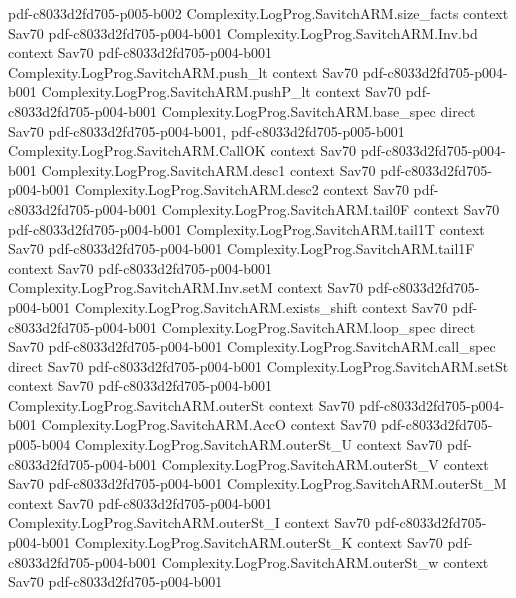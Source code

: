 \begin{theorem}
{    pdf-c8033d2fd705-p005-b002}
\proofstep
  {Complexity.LogProg.SavitchARM.size_facts}
  {context}
  {Sav70}
  {pdf-c8033d2fd705-p004-b001}
\proofstep
  {Complexity.LogProg.SavitchARM.Inv.bd}
  {context}
  {Sav70}
  {pdf-c8033d2fd705-p004-b001}
\proofstep
  {Complexity.LogProg.SavitchARM.push_lt}
  {context}
  {Sav70}
  {pdf-c8033d2fd705-p004-b001}
\proofstep
  {Complexity.LogProg.SavitchARM.pushP_lt}
  {context}
  {Sav70}
  {pdf-c8033d2fd705-p004-b001}
\proofstep
  {Complexity.LogProg.SavitchARM.base_spec}
  {direct}
  {Sav70}
  {pdf-c8033d2fd705-p004-b001,
    pdf-c8033d2fd705-p005-b001}
\proofstep
  {Complexity.LogProg.SavitchARM.CallOK}
  {context}
  {Sav70}
  {pdf-c8033d2fd705-p004-b001}
\proofstep
  {Complexity.LogProg.SavitchARM.desc1}
  {context}
  {Sav70}
  {pdf-c8033d2fd705-p004-b001}
\proofstep
  {Complexity.LogProg.SavitchARM.desc2}
  {context}
  {Sav70}
  {pdf-c8033d2fd705-p004-b001}
\proofstep
  {Complexity.LogProg.SavitchARM.tail0F}
  {context}
  {Sav70}
  {pdf-c8033d2fd705-p004-b001}
\proofstep
  {Complexity.LogProg.SavitchARM.tail1T}
  {context}
  {Sav70}
  {pdf-c8033d2fd705-p004-b001}
\proofstep
  {Complexity.LogProg.SavitchARM.tail1F}
  {context}
  {Sav70}
  {pdf-c8033d2fd705-p004-b001}
\proofstep
  {Complexity.LogProg.SavitchARM.Inv.setM}
  {context}
  {Sav70}
  {pdf-c8033d2fd705-p004-b001}
\proofstep
  {Complexity.LogProg.SavitchARM.exists_shift}
  {context}
  {Sav70}
  {pdf-c8033d2fd705-p004-b001}
\proofstep
  {Complexity.LogProg.SavitchARM.loop_spec}
  {direct}
  {Sav70}
  {pdf-c8033d2fd705-p004-b001}
\proofstep
  {Complexity.LogProg.SavitchARM.call_spec}
  {direct}
  {Sav70}
  {pdf-c8033d2fd705-p004-b001}
\proofstep
  {Complexity.LogProg.SavitchARM.setSt}
  {context}
  {Sav70}
  {pdf-c8033d2fd705-p004-b001}
\proofstep
  {Complexity.LogProg.SavitchARM.outerSt}
  {context}
  {Sav70}
  {pdf-c8033d2fd705-p004-b001}
\proofstep
  {Complexity.LogProg.SavitchARM.AccO}
  {context}
  {Sav70}
  {pdf-c8033d2fd705-p005-b004}
\proofstep
  {Complexity.LogProg.SavitchARM.outerSt_U}
  {context}
  {Sav70}
  {pdf-c8033d2fd705-p004-b001}
\proofstep
  {Complexity.LogProg.SavitchARM.outerSt_V}
  {context}
  {Sav70}
  {pdf-c8033d2fd705-p004-b001}
\proofstep
  {Complexity.LogProg.SavitchARM.outerSt_M}
  {context}
  {Sav70}
  {pdf-c8033d2fd705-p004-b001}
\proofstep
  {Complexity.LogProg.SavitchARM.outerSt_I}
  {context}
  {Sav70}
  {pdf-c8033d2fd705-p004-b001}
\proofstep
  {Complexity.LogProg.SavitchARM.outerSt_K}
  {context}
  {Sav70}
  {pdf-c8033d2fd705-p004-b001}
\proofstep
  {Complexity.LogProg.SavitchARM.outerSt_w}
  {context}
  {Sav70}
  {pdf-c8033d2fd705-p004-b001}

\end{theorem}
